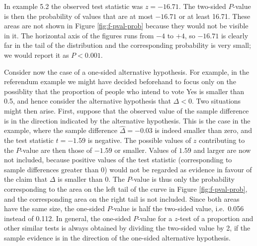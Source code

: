 \documentclass[11pt,a4paper,openany]{book}
\begin{document}
In example 5.2 the observed test statistic was \(z=-16.71\). The
two-sided \(P\)-value is then the probability of values that are at most
\(-16.71\) or at least 16.71. These areas are not shown in Figure
\ref{fig:f-pval-prob} because they would not be visible in it. The
horizontal axis of the figures runs from \(-4\) to \(+4\), so \(-16.71\)
is clearly far in the tail of the distribution and the corresponding
probability is very small; we would report it as \(P<0.001\).

Consider now the case of a one-sided alternative hypothesis. For
example, in the referendum example we might have decided beforehand to
focus only on the possiblity that the proportion of people who intend to
vote Yes is smaller than 0.5, and hence consider the alternative
hypothesis that \(\Delta<0\). Two situations might then arise. First,
suppose that the observed value of the sample difference is in the
direction indicated by the alternative hypothesis. This is the case in
the example, where the sample difference \(\hat{\Delta}=-0.03\) is
indeed smaller than zero, and the test statistic \(t=-1.59\) is
negative. The possible values of \(z\) contributing to the \(P\)-value
are then those of \(-1.59\) or smaller. Values of \(1.59\) and larger
are now not included, because positive values of the test statistic
(corresponding to sample differences greater than 0) would not be
regarded as evidence in favour of the claim that \(\Delta\) is smaller
than 0. The \(P\)-value is thus only the probability corresponding to
the area on the left tail of the curve in Figure \ref{fig:f-pval-prob},
and the corresponding area on the right tail is not included. Since both
areas have the same size, the one-sided \(P\)-value is half the
two-sided value, i.e.~0.056 instead of 0.112. In general, the one-sided
\(P\)-value for a \(z\)-test of a proportion and other similar tests is
always obtained by dividing the two-sided value by 2, if the sample
evidence is in the direction of the one-sided alternative hypothesis.
\end{document}
